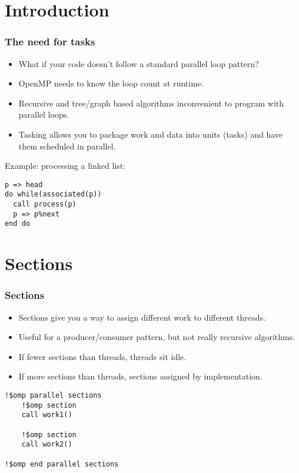 \documentclass{beamer}
\begin{document}
\section{Introduction}
\begin{frame}[fragile]
\frametitle{The need for tasks}
\begin{itemize}
  \item What if your code doesn't follow a standard parallel loop pattern?
  \item OpenMP needs to know the loop count at runtime.
  \item Recursive and tree/graph based algorithms inconvenient to program with parallel loops.
  \item Tasking allows you to package work and data into units (tasks) and have them scheduled in parallel.
\end{itemize}

Example: processing a linked list:
\begin{verbatim}
p => head
do while(associated(p))
  call process(p)
  p => p%next
end do
\end{verbatim}
\end{frame}
\section{Sections}
\begin{frame}[fragile]
\frametitle{Sections}
\begin{itemize}
  \item Sections give you a way to assign different work to different threads.
  \item Useful for a producer/consumer pattern, but not really recursive algorithms.
  \item If fewer sections than threads, threads sit idle.
  \item If more sections than threads, sections assigned by implementation.
\end{itemize}

\begin{verbatim}
!$omp parallel sections
    !$omp section
    call work1()

    !$omp section
    call work2()

!$omp end parallel sections
\end{verbatim}
\end{frame}
\end{document}
